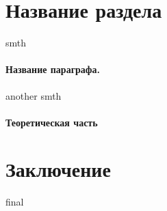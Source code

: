 \documentclass[12pt,twoside]{article}
\begin{document}
\section{Название раздела}
smth

\paragraph{Название параграфа.}
another smth

\paragraph{Теоретическая часть} 


\section{Заключение}
final






\end{document}
